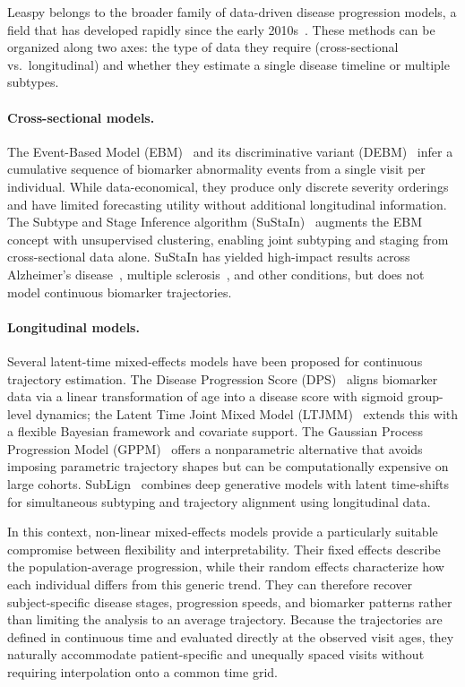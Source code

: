 \documentclass{rapportCS}
\begin{document}
Leaspy belongs to the broader family of data-driven disease progression models, a field that has developed rapidly since the early 2010s~\cite{oxtoby2023data,young2024data}. These methods can be organized along two axes: the type of data they require (cross-sectional vs.\ longitudinal) and whether they estimate a single disease timeline or multiple subtypes.

\paragraph{Cross-sectional models.} The Event-Based Model (EBM)~\cite{fonteijn2012event} and its discriminative variant (DEBM)~\cite{venkatraghavan2019disease} infer a cumulative sequence of biomarker abnormality events from a single visit per individual. While data-economical, they produce only discrete severity orderings and have limited forecasting utility without additional longitudinal information. The Subtype and Stage Inference algorithm (SuStaIn)~\cite{young2018uncovering} augments the EBM concept with unsupervised clustering, enabling joint subtyping and staging from cross-sectional data alone. SuStaIn has yielded high-impact results across Alzheimer's disease~\cite{vogel2021four}, multiple sclerosis~\cite{eshaghi2021identifying}, and other conditions, but does not model continuous biomarker trajectories.

\paragraph{Longitudinal models.} Several latent-time mixed-effects models have been proposed for continuous trajectory estimation. The Disease Progression Score (DPS)~\cite{jedynak2012computational} aligns biomarker data via a linear transformation of age into a disease score with sigmoid group-level dynamics; the Latent Time Joint Mixed Model (LTJMM)~\cite{li2019bayesian} extends this with a flexible Bayesian framework and covariate support. The Gaussian Process Progression Model (GPPM)~\cite{lorenzi2019probabilistic} offers a nonparametric alternative that avoids imposing parametric trajectory shapes but can be computationally expensive on large cohorts. SubLign~\cite{chen2022clustering} combines deep generative models with latent time-shifts for simultaneous subtyping and trajectory alignment using longitudinal data.

In this context, non-linear mixed-effects models provide a particularly suitable compromise between flexibility and interpretability. Their fixed effects describe the population-average progression, while their random effects characterize how each individual differs from this generic trend. They can therefore recover subject-specific disease stages, progression speeds, and biomarker patterns rather than limiting the analysis to an average trajectory. Because the trajectories are defined in continuous time and evaluated directly at the observed visit ages, they naturally accommodate patient-specific and unequally spaced visits without requiring interpolation onto a common time grid.
\end{document}
